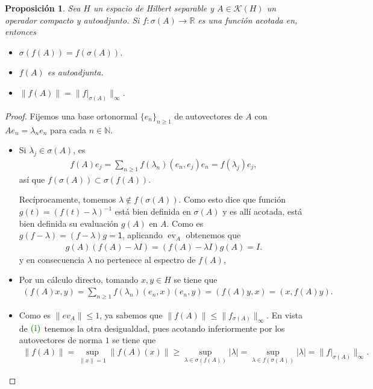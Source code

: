 \documentclass[11pt]{report}
\theoremstyle{colored}
\newtheorem{proposition}{Proposición}[section]
\newcommand{\N}{\mathbb{N}}
\newcommand{\R}{\mathbb{R}}
\newcommand{\ev}{\operatorname{ev}}
\newcommand{\ip}[1]{( #1 )}
\newcommand{\paint}[1]{\color{color}{#1}}
\newcommand{\tpaint}[1]{\paint{\textbf{#1}}}
\begin{document}
\begin{proposition} Sea $H$ un espacio de Hilbert separable y $A \in \mathscr{K}(H)$ un operador compacto y autoadjunto. Si $f : \sigma(A) \to \R$ es una función acotada en, entonces
\begin{itemize}
\item[(i)] $\sigma(f(A)) = f(\sigma(A))$.
\item[(ii)] $f(A)$ es autoadjunta.
\item[(iii)] $\|f(A)\| = \|f|_{\sigma(A)}\|_{\infty}$.
\end{itemize}
\end{proposition}
\begin{proof} Fijemos una base ortonormal $\{e_n\}_{n \geq 1}$ de autovectores de $A$ con $Ae_n = \lambda_ne_n$ para cada $n \in \N$. 
\begin{itemize}[listparindent = \parindent]
\item[(i)] Si $\lambda_j \in \sigma(A)$, es
\begin{align*}
f(A)e_j = \sum_{n \geq 1}f(\lambda_n)(e_n,e_j)e_n = f(\lambda_j)e_j,
\end{align*}
así que $f(\sigma(A)) \subset \sigma(f(A))$. 

Recíprocamente, tomemos $\lambda \not \in f(\sigma(A))$. Como esto dice que función $g(t) = (f(t)-\lambda)^{-1}$ está bien definida en $\sigma(A)$ y es allí acotada, está bien definida su evaluación $g(A)$ en $A$. Como es $g(f-\lambda) = (f-\lambda)g = \mathsf{1}$, aplicando $\ev_A$ obtenemos que
\begin{align*}
g(A)(f(A)- \lambda I) = (f(A) - \lambda I)g(A) = I.
\end{align*}
y en consecuencia $\lambda$ no pertenece al espectro de $f(A)$,
\item[(ii)] Por un cálculo directo, tomando $x,y \in H$ se tiene que 
\begin{align*}
\ip{f(A)x, y} = \sum_{n \geq 1} f(\lambda_n) \ip{e_n, x}\ip{e_n,y}  = \ip{f(A)y,x} = \ip{x, f(A)y}.
\end{align*}
\item[(iii)] Como es $\|ev_A\| \leq 1$, ya sabemos que $\|f(A)\| \leq \|f_{\sigma(A)}\|_\infty$. En vista de $\tpaint{(i)}$ tenemos la otra desigualdad, pues acotando inferiormente por los autovectores de norma $1$ se tiene que 
\begin{align*}
\|f(A)\| = \sup_{\|x\| = 1}\|f(A)(x)\| \geq \sup_{\lambda \in \sigma(f(A))}|\lambda| = \sup_{\lambda \in f(\sigma(A))}|\lambda| = \|f|_{\sigma(A)}\|_\infty.
\end{align*}
\end{itemize}
\end{proof}
\end{document}
